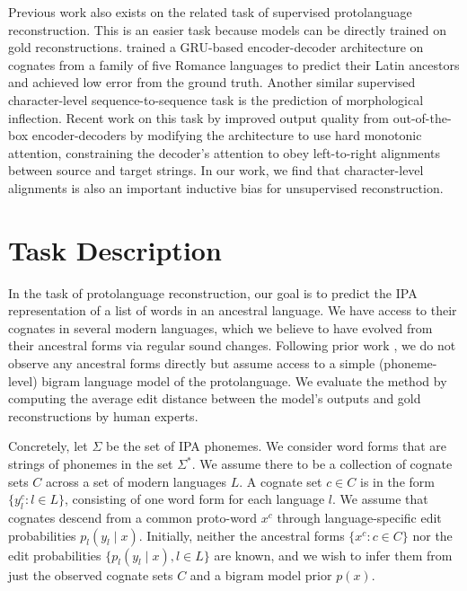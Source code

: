 \documentclass[11pt]{article}
\begin{document}
Previous work also exists on the related task of supervised protolanguage reconstruction. This is an easier task because models can be directly trained on gold reconstructions. \citet{meloni-etal-2021-ab} trained a GRU-based encoder-decoder architecture on cognates from a family of five Romance languages to predict their Latin ancestors and achieved low error from the ground truth. Another similar supervised character-level sequence-to-sequence task is the prediction of morphological inflection. Recent work on this task by \citet{DBLP:journals/corr/AharoniG16} improved output quality from out-of-the-box encoder-decoders by modifying the architecture to use hard monotonic attention, constraining the decoder’s attention to obey left-to-right alignments between source and target strings. In our work, we find that character-level alignments is also an important inductive bias for unsupervised reconstruction. 

\section{Task Description}
In the task of protolanguage reconstruction, our goal is to predict the IPA representation of a list of words in an ancestral language. We have access to their cognates in several modern languages, which we believe to have evolved from their ancestral forms via regular sound changes. Following prior work \citep[e.g.,][]{bouchard-etal-2007-probabilistic, NIPS2007_7ce3284b}, we do not observe any ancestral forms directly but assume access to a simple (phoneme-level) bigram language model of the protolanguage.
We evaluate the method by computing the average edit distance between the model's outputs and gold reconstructions by human experts. 

Concretely, let $\Sigma$ be the set of IPA phonemes. We consider word forms that are strings of phonemes in the set $\Sigma^*$. We assume there to be a collection of cognate sets $C$ across a set of modern languages $L$. A cognate set $c \in C$ is in the form $\{y_l^c: l \in L\}$, consisting of one word form for each language $l$. We assume that cognates descend from a common proto-word $x^c$ through language-specific edit probabilities $p_l(y_l \mid x)$.
Initially, neither the ancestral forms $\{x^c: c \in C\}$ nor the edit probabilities $\{p_l(y_l \mid x), l \in L\}$ are known, and we wish to infer them from just the observed cognate sets $C$ and a bigram model prior $p(x)$.   
\end{document}
